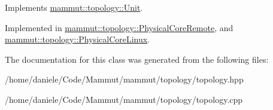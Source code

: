 Implements \hyperlink{classmammut_1_1topology_1_1Unit_a70730dde75533d3f5ecd3d3686df87cc}{mammut\-::topology\-::\-Unit}.



Implemented in \hyperlink{classmammut_1_1topology_1_1PhysicalCoreRemote_a5f76fa7a3b9c61597ad06a2fce8db675}{mammut\-::topology\-::\-Physical\-Core\-Remote}, and \hyperlink{classmammut_1_1topology_1_1PhysicalCoreLinux_a6c65161ad3041a8cedb8a9bc43757c02}{mammut\-::topology\-::\-Physical\-Core\-Linux}.



The documentation for this class was generated from the following files\-:\begin{DoxyCompactItemize}
\item 
/home/daniele/\-Code/\-Mammut/mammut/topology/topology.\-hpp\item 
/home/daniele/\-Code/\-Mammut/mammut/topology/topology.\-cpp\end{DoxyCompactItemize}
